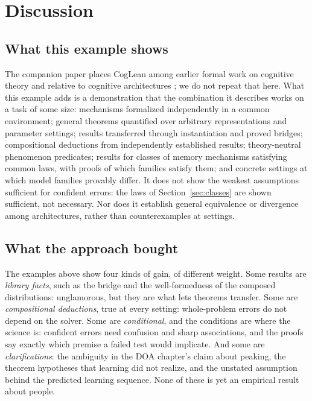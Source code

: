 \documentclass[11pt]{article}
\begin{document}
\section{Discussion}
\label{sec:discussion}

\subsection{What this example shows}
\label{sec:program}

The companion paper places CogLean among earlier formal work on cognitive theory and relative to cognitive architectures \citep{shrager2026coglean}; we do not repeat that here. What this example adds is a demonstration that the combination it describes works on a task of some size: mechanisms formalized independently in a common environment; general theorems quantified over arbitrary representations and parameter settings; results transferred through instantiation and proved bridges; compositional deductions from independently established results; theory-neutral phenomenon predicates; results for classes of memory mechanisms satisfying common laws, with proofs of which families satisfy them; and concrete settings at which model families provably differ. It does not show the weakest assumptions sufficient for confident errors: the laws of Section~\ref{sec:classes} are shown sufficient, not necessary. Nor does it establish general equivalence or divergence among architectures, rather than counterexamples at settings.

\subsection{What the approach bought}

The examples above show four kinds of gain, of different weight. Some results are \emph{library facts}, such as the bridge and the well-formedness of the composed distributions: unglamorous, but they are what lets theorems transfer. Some are \emph{compositional deductions}, true at every setting: whole-problem errors do not depend on the solver. Some are \emph{conditional}, and the conditions are where the science is: confident errors need confusion and sharp associations, and the proofs say exactly which premise a failed test would implicate. And some are \emph{clarifications}: the ambiguity in the DOA chapter's claim about peaking, the theorem hypotheses that learning did not realize, and the unstated assumption behind the predicted learning sequence. None of these is yet an empirical result about people.
\end{document}
